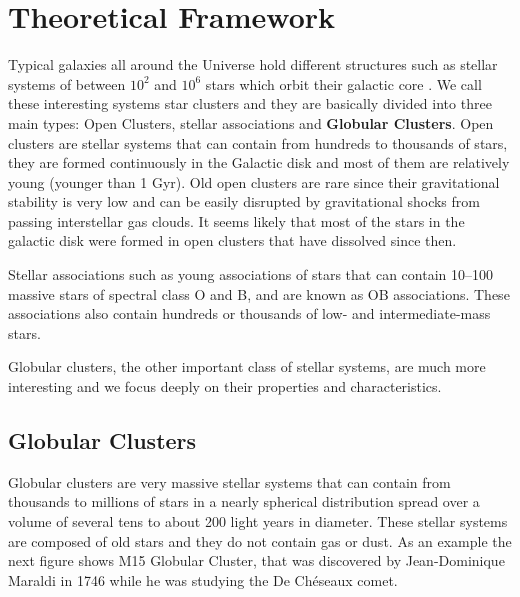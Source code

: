\chapter{Theoretical Framework}

Typical galaxies all around the Universe hold different structures such as stellar systems of between $ 10^{2} $ and $ 10^{6} $ stars which orbit their galactic core . We call these interesting systems star clusters and they are basically divided into three main types: Open Clusters, stellar associations and \textbf{Globular Clusters}. Open clusters are stellar systems that can contain from hundreds to thousands of stars, they are formed continuously in the Galactic disk and most of them are relatively young (younger than 1 Gyr). Old open clusters are rare since their gravitational stability is very low and can be easily disrupted by gravitational shocks from passing interstellar gas clouds. It seems likely that most of the stars in the galactic disk were formed in open clusters that have dissolved since then. 

Stellar associations such as young associations of stars that can contain 10–100 massive stars of spectral class O and B, and are known as OB associations. These associations also contain hundreds or thousands of low- and intermediate-mass stars.

Globular clusters, the other important class of stellar systems, are much more interesting and we focus deeply on their properties and characteristics.  

\section{Globular Clusters}
 
Globular clusters are very massive stellar systems that can contain from thousands to millions of stars in a nearly spherical distribution spread over a volume of several tens to about 200 light years in diameter. These stellar systems are composed of old stars and they do not contain gas or dust. As an example the next figure shows M15 Globular Cluster, that was discovered by Jean-Dominique Maraldi in 1746 while he was studying the De Chéseaux comet.

